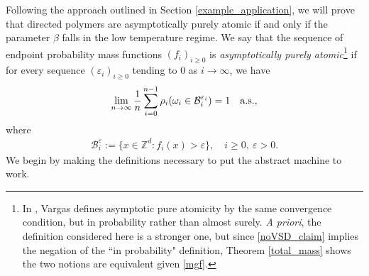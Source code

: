 \documentclass[11pt,reqno]{amsart}
\numberwithin{equation}{section}
\theoremstyle{definition}
\begin{document}
Following the approach outlined in Section \ref{example_application}, we will prove that directed polymers are asymptotically purely atomic if and only if the parameter $\beta$ falls in the low temperature regime.
We say that the sequence of endpoint probability mass functions $(f_i)_{i \geq 0}$ is \textit{asymptotically purely atomic}\footnote{In \cite{vargas07}, Vargas defines asymptotic pure atomicity by the same convergence condition, but in probability rather than almost surely.  \textit{A priori}, the definition considered here is a stronger one, but since \eqref{noVSD_claim} implies the negation of the ``in probability" definition, Theorem \ref{total_mass} shows the two notions are equivalent given \eqref{mgf}.}  if for every sequence $({\varepsilon}_i)_{i \geq 0}$ tending to $0$ as $i \to \infty$, we have
{\begin{align} \begin{split} { \label{apa_def}
\lim_{n \to \infty} \frac{1}{n} \sum_{i = 0}^{n-1} \rho_i(\omega_i \in {\mathcal{B}}_i^{{\varepsilon}_i}) = 1 \quad \mathrm{a.s.},
} \end{split} \end{align}}
where
{\begin{align*} {
{\mathcal{B}}_i^{\varepsilon} := \{x \in {\mathbb{Z}}^d : f_i(x) > {\varepsilon}\}, \quad i \geq 0,\ {\varepsilon} > 0.
} \end{align*}}
We begin by making the definitions necessary to put the abstract machine to work.
\end{document}
